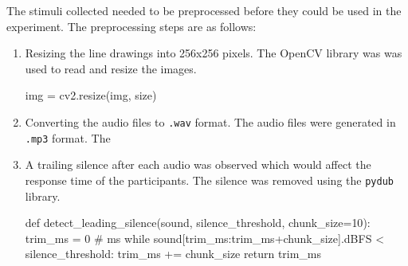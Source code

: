 \documentclass[
  a4paper,
]{article}
\newenvironment{Shaded}{}{}
\newcommand{\AttributeTok}[1]{\textcolor[rgb]{0.84,0.23,0.29}{#1}}
\newcommand{\CommentTok}[1]{\textcolor[rgb]{0.42,0.45,0.49}{#1}}
\newcommand{\ControlFlowTok}[1]{\textcolor[rgb]{0.84,0.23,0.29}{#1}}
\newcommand{\DecValTok}[1]{\textcolor[rgb]{0.00,0.36,0.77}{#1}}
\newcommand{\ExtensionTok}[1]{\textcolor[rgb]{0.84,0.23,0.29}{\textbf{#1}}}
\newcommand{\FunctionTok}[1]{\textcolor[rgb]{0.44,0.26,0.76}{#1}}
\newcommand{\KeywordTok}[1]{\textcolor[rgb]{0.84,0.23,0.29}{#1}}
\newcommand{\NormalTok}[1]{\textcolor[rgb]{0.14,0.16,0.18}{#1}}
\newcommand{\OperatorTok}[1]{\textcolor[rgb]{0.14,0.16,0.18}{#1}}
\newcommand{\PreprocessorTok}[1]{\textcolor[rgb]{0.84,0.23,0.29}{#1}}
\newcommand{\StringTok}[1]{\textcolor[rgb]{0.01,0.18,0.38}{#1}}
\newcommand{\VariableTok}[1]{\textcolor[rgb]{0.89,0.38,0.04}{#1}}
\begin{document}
The stimuli collected needed to be preprocessed before they could be
used in the experiment. The preprocessing steps are as follows:

\begin{enumerate}
\def\labelenumi{\arabic{enumi}.}
\item
  Resizing the line drawings into 256x256 pixels. The OpenCV library was
  was used to read and resize the images.

\begin{Shaded}
\begin{Highlighting}[]
\NormalTok{img }\OperatorTok{=}\NormalTok{ cv2.resize(img, size)}
\end{Highlighting}
\end{Shaded}
\item
  Converting the audio files to \texttt{.wav} format. The audio files
  were generated in \texttt{.mp3} format. The

\begin{Shaded}
\end{Shaded}
\item
  A trailing silence after each audio was observed which would affect
  the response time of the participants. The silence was removed using
  the \texttt{pydub} library.

\begin{Shaded}
\begin{Highlighting}[]
    \KeywordTok{def}\NormalTok{ detect\_leading\_silence(sound, silence\_threshold, chunk\_size}\OperatorTok{=}\DecValTok{10}\NormalTok{):}
\NormalTok{        trim\_ms }\OperatorTok{=} \DecValTok{0} \CommentTok{\# ms}
        \ControlFlowTok{while}\NormalTok{ sound[trim\_ms:trim\_ms}\OperatorTok{+}\NormalTok{chunk\_size].dBFS }\OperatorTok{\textless{}}\NormalTok{ silence\_threshold:}
\NormalTok{            trim\_ms }\OperatorTok{+=}\NormalTok{ chunk\_size}
        \ControlFlowTok{return}\NormalTok{ trim\_ms}
\end{Highlighting}
\end{Shaded}


\end{enumerate}
\end{document}
